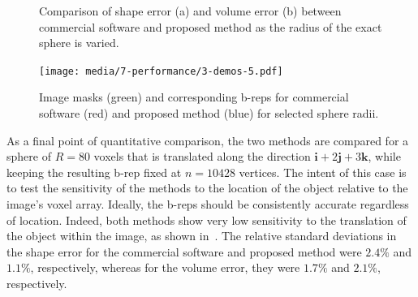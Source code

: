 \begin{figure}[b!]
	\centering
	\caption{Comparison of shape error (a) and volume error (b) between commercial software and proposed method as the radius of the exact sphere is varied.}
	\label{fig:graph2}
\end{figure}
\begin{figure}[ht!]
	\centering
	\texttt{[image: media/7-performance/3-demos-5.pdf]}
	\caption{Image masks (green) and corresponding b-reps for commercial software (red) and proposed method (blue) for selected sphere radii.}
	\label{fig:demos2}
\end{figure}
{\noindent}As a final point of quantitative comparison, the two methods are compared for a sphere of $R = 80$ voxels that is translated along the direction $\bm{i}  + 2\bm{j} + 3\bm{k}$, while keeping the resulting b-rep fixed at $n = 10428$ vertices. The intent of this case is to test the sensitivity of the methods to the location of the object relative to the image's voxel array. Ideally, the b-reps should be consistently accurate regardless of location.  Indeed, both methods show very low sensitivity to the translation of the object within the image, as shown in~. The relative standard deviations in the shape error for the commercial software and proposed method were $2.4\%$ and $1.1\%$, respectively, whereas for the volume error, they were $1.7\%$ and $2.1\%$, respectively. \\


